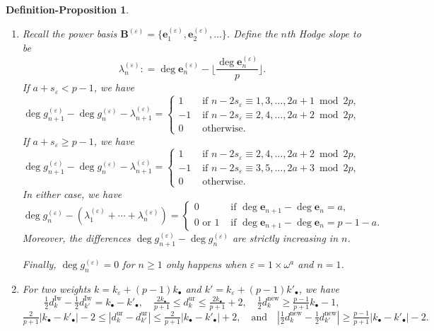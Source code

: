 \documentclass[12pt]{amsart}
\newtheorem{definition-proposition}[subsection]{Definition-Proposition}
\theoremstyle{definition}
\numberwithin{equation}{subsection}
\def\bfB{\mathbf{B}}
\def\bfe{\mathbf{e}}
\newcommand{\new}{\mathrm{new}}
\newcommand{\Iw}{\mathrm{Iw}}
\newcommand{\ur}{\mathrm{ur}}
\begin{document}
\begin{definition-proposition}
\begin{enumerate}
\item Recall the power basis $\bfB^{(\varepsilon)} = \{\bfe_1^{(\varepsilon)}, \bfe_2^{(\varepsilon)}, \dots\}$. Define the \emph{$n$th Hodge slope} to be
$$
\lambda_n^{(\varepsilon)}: = \deg \bfe_n^{(\varepsilon)} - \Big\lfloor \frac{\deg\bfe_n^{(\varepsilon)} }p \Big\rfloor.
$$
If $a+s_\varepsilon<p-1$, we have
\begin{equation}
\label{E:increment of degree a+s<p-1}
\deg g_{n+1}^{(\varepsilon)} - \deg g_{n}^{(\varepsilon)} - \lambda_{n+1}^{(\varepsilon)} =\begin{cases}
1 & \textrm{ if } n - 2s_\varepsilon \equiv 1, 3, \dots, 2a+1 \bmod {2p},
\\
-1 & \textrm{ if } n- 2s_{\varepsilon} \equiv 2, 4, \dots, 2a+2 \bmod{2p},
\\
0 & \textrm{ otherwise.}
\end{cases}
\end{equation}
If $a+s_\varepsilon\geq p-1$, we have
\begin{equation}
\label{E:increment of degree a+s>=p-1}
\deg g_{n+1}^{(\varepsilon)} - \deg g_{n}^{(\varepsilon)} - \lambda_{n+1}^{(\varepsilon)} =\begin{cases}
1 & \textrm{ if } n - 2s_\varepsilon \equiv 2, 4, \dots, 2a+2 \bmod {2p},
\\
-1 & \textrm{ if } n- 2s_{\varepsilon} \equiv 3, 5, \dots, 2a+3 \bmod{2p},
\\
0 & \textrm{ otherwise.}
\end{cases}
\end{equation}
In either case, we have
\begin{equation}
\label{E:degree approx halo bound}
\deg g_n^{(\varepsilon)} - (\lambda_1^{(\varepsilon)}+\cdots + \lambda_n^{(\varepsilon)}) = \begin{cases}
0 & \textrm{ if }\deg \bfe_{n+1}-\deg\bfe_n = a,\\
0 \textrm{ or }1 & \textrm{ if }\deg \bfe_{n+1}-\deg\bfe_n = p-1-a.
\end{cases}
\end{equation}
Moreover, the differences $\deg g_{n+1}^{(\varepsilon)} - \deg g_n^{(\varepsilon)}$ are strictly increasing in $n$.

Finally, $\deg g_n^{(\varepsilon)} = 0$ for $n \geq 1$ only happens when $\varepsilon = 1\times \omega^a$ and $n=1$.

\item For two weights $k = k_\varepsilon + (p-1)k_\bullet$ and $k' = k_\varepsilon + (p-1)k'_\bullet$, we have
$$
\tfrac 12 d_k^\Iw - \tfrac 12 d_{k'}^\Iw = k_\bullet - k'_\bullet,\quad
\tfrac{2k_\bullet}{p+1}\leq d_k^\ur\leq \tfrac{2k_\bullet}{p+1}+2, \quad \tfrac 12 d_k^\new \geq \tfrac {p-1}{p+1}k_\bullet -1,
$$
$$
\tfrac{2}{p+1}|k_\bullet-k'_\bullet| - 2 \leq |d_k^\ur - d_{k'}^\ur| \leq \tfrac{2}{p+1}|k_\bullet-k'_\bullet| + 2, \quad \textrm{and}\quad
|\tfrac 12 d_k^\new-\tfrac 12d_{k'}^\new| \geq \tfrac{p-1}{p+1}|k_\bullet-k'_\bullet| - 2.
$$
\end{enumerate}
 

\end{definition-proposition}
\end{document}
